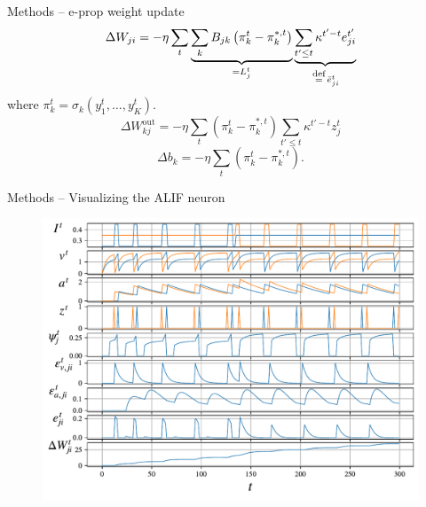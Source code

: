 \documentclass[t]{beamer}
\newcommand\eqdef{\ \mathrel{\overset{\makebox[0pt]{\mbox{\normalfont\scriptsize\rmfamily def}}}{=}}\ }
\begin{document}
\begin{frame}{Methods -- e-prop weight update}
  \begin{equation}
    \Delta W_{ji} = -\eta\sum_t\underbrace{\sum_kB_{jk}\left(\pi^{t}_k - \pi^{*,t}_k\right)}_{=L^t_j}\underbrace{\sum_{t'\leq t}\kappa^{t'-t}e^{t'}_{ji}}_{\eqdef \bar{e}^t_{ji}}
    \end{equation}
    where $\pi^t_k = \sigma_k\left(y^t_1,\ldots,y^t_K\right)$.
    \begin{equation}
    \Delta W^\text{out}_{kj} = -\eta \sum_t\left(\pi^t_k - \pi^{*,t}_k\right)\sum_{t'\leq t}\kappa^{t'-t}z^t_j
    \end{equation}
    \begin{equation}
    \Delta b_k = -\eta \sum_t\left(\pi^t_k - \pi^{*,t}_k\right).
    \end{equation}
\end{frame}

\begin{frame}{Methods -- Visualizing the ALIF neuron}
  \begin{figure}[!ht]
    \centering
    \includegraphics[width=0.8\linewidth]{alif}
  \end{figure}
\end{frame}
\end{document}
